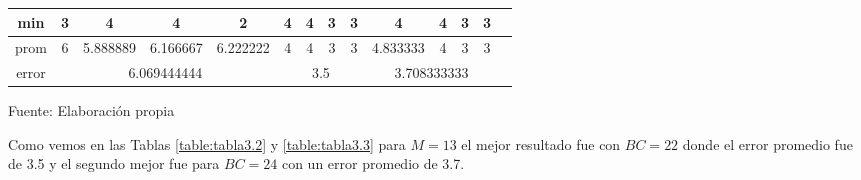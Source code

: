 \begin{center}
\begin{table}[H]
{\begin{tabular}{|c|c|c|c|c|c|c|c|c|c|c|c|c|c|}
\hline 
min & 
3 & 4 & 4 & 2 & 4 & 4 & 3 & 3 & 4 & 4 & 3 & 3 \\
\hline 
prom & 
6 & 5.888889 & 6.166667 & 6.222222 & 4 & 4 & 3 & 3 & 4.833333 & 4 & 3 & 3 \\
\hline 
error & 
\multicolumn{4}{c|}{6.069444444} & 
\multicolumn{4}{c|}{3.5} & 
\multicolumn{4}{c|}{3.708333333}\\ 
\hline 
\end{tabular} 
}
\begin{center}
\vskip 0.2cm
{\small{Fuente: Elaboración propia}}
\end{center}
\end{table}
\end{center}

\vskip -0.5cm
Como vemos en las Tablas \ref{table:tabla3.2} y \ref{table:tabla3.3} para $M = 13$ el mejor resultado fue con $BC = 22$ donde el error promedio fue de 3.5 y el segundo mejor fue para $BC = 24$ con un error promedio de 3.7.
\vskip -0.5cm


